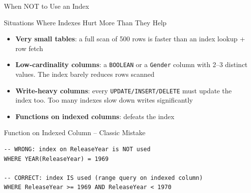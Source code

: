 \begin{frame}[fragile]{When NOT to Use an Index}
  \begin{block}{Situations Where Indexes Hurt More Than They Help}
    \begin{itemize}
      \item \textbf{Very small tables}: a full scan of 500 rows is faster
            than an index lookup + row fetch
      \item \textbf{Low-cardinality columns}: a \texttt{BOOLEAN} or a
            \texttt{Gender} column with 2--3 distinct values. The index
            barely reduces rows scanned
      \item \textbf{Write-heavy columns}: every \texttt{UPDATE/INSERT/DELETE}
            must update the index too. Too many indexes slow down writes
            significantly
      \item \textbf{Functions on indexed columns}: defeats the index
    \end{itemize}
  \end{block}

  \begin{alertblock}{Function on Indexed Column -- Classic Mistake}
\begin{lstlisting}[style=sqlstyle]
-- WRONG: index on ReleaseYear is NOT used
WHERE YEAR(ReleaseYear) = 1969

-- CORRECT: index IS used (range query on indexed column)
WHERE ReleaseYear >= 1969 AND ReleaseYear < 1970
\end{lstlisting}
  \end{alertblock}
\end{frame}
